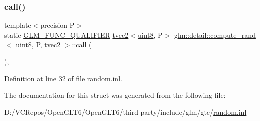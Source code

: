 \subsubsection{\texorpdfstring{call()}{call()}}
{\footnotesize\ttfamily template$<$precision P$>$ \\
static \mbox{\hyperlink{setup_8hpp_a33fdea6f91c5f834105f7415e2a64407}{G\+L\+M\+\_\+\+F\+U\+N\+C\+\_\+\+Q\+U\+A\+L\+I\+F\+I\+ER}} \mbox{\hyperlink{structglm_1_1tvec2}{tvec2}}$<$\mbox{\hyperlink{namespaceglm_1_1detail_aef2588f97d090cc19fbbe0c74fe17c8f}{uint8}}, P$>$ \mbox{\hyperlink{structglm_1_1detail_1_1compute__rand}{glm\+::detail\+::compute\+\_\+rand}}$<$ \mbox{\hyperlink{namespaceglm_1_1detail_aef2588f97d090cc19fbbe0c74fe17c8f}{uint8}}, P, \mbox{\hyperlink{structglm_1_1tvec2}{tvec2}} $>$\+::call (\begin{DoxyParamCaption}{ }\end{DoxyParamCaption})\hspace{0.3cm}{\ttfamily [inline]}, {\ttfamily [static]}}



Definition at line 32 of file random.\+inl.



The documentation for this struct was generated from the following file\+:\begin{DoxyCompactItemize}
\item 
D\+:/\+V\+C\+Repos/\+Open\+G\+L\+T6/\+Open\+G\+L\+T6/third-\/party/include/glm/gtc/\mbox{\hyperlink{random_8inl}{random.\+inl}}\end{DoxyCompactItemize}
